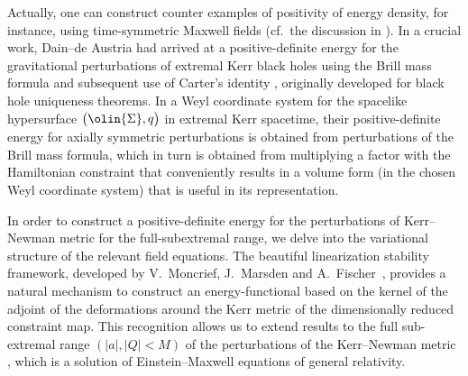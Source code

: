 Actually, one can construct counter examples of positivity of energy density, for instance, using time-symmetric Maxwell fields (cf.\ the discussion in \cite[Section 2]{GM17_gentitle}). In a crucial work, Dain--de Austria \cite{DA_14} had arrived at a positive-definite energy for the gravitational perturbations of extremal Kerr black holes using the Brill mass formula \cite{D09} and subsequent use of Carter's identity \cite{Car_71}, originally developed for black hole uniqueness theorems. In a Weyl coordinate system for the spacelike hypersurface $\bigl(\olin{\Sigma}, q\bigr)$ in extremal Kerr spacetime, their positive-definite energy for axially symmetric perturbations is obtained
from perturbations of the Brill mass formula, which in turn is obtained from multiplying a factor with the Hamiltonian constraint that conveniently results in a volume form (in the chosen Weyl coordinate system) that is useful in its representation.

In order to construct a positive-definite energy for the perturbations of Kerr--Newman metric for the full-subextremal range, we delve into the variational structure of the relevant field equations. The beautiful linearization stability framework, developed by V.~Moncrief, J.~Marsden and A.~Fischer~\cite{FM_75,FMM_80,Mon_75}, provides a
natural mechanism to construct an energy-functional based on the kernel of the adjoint of the deformations around the Kerr metric of the dimensionally reduced constraint map. This recognition allows us to extend results to the full sub-extremal range $(\vert a \vert, \vert Q \vert <M)$ of the perturbations of the Kerr--Newman metric \cite{GM17_gentitle}, which is a solution of Einstein--Maxwell equations of general relativity.

